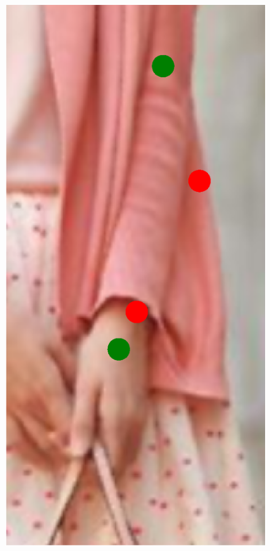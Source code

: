 \begin{figure}[!t]
    \includegraphics[height=\fh]{resources/Fixing/fix_20}
    \hfill

\end{figure}
